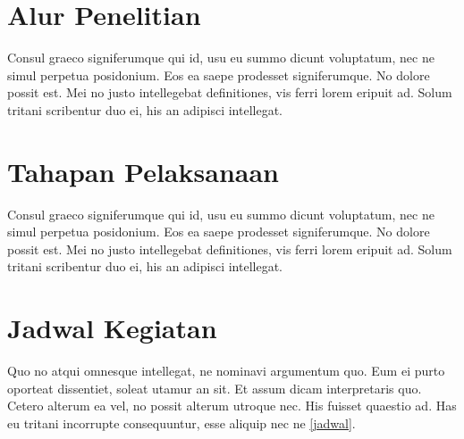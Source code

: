 \section{Alur Penelitian}
	Consul graeco signiferumque qui id, usu eu summo dicunt voluptatum, nec ne simul perpetua posidonium. Eos ea saepe prodesset signiferumque. No dolore possit est. Mei no justo intellegebat definitiones, vis ferri lorem eripuit ad. Solum tritani scribentur duo ei, his an adipisci intellegat.

\section{Tahapan Pelaksanaan}
	Consul graeco signiferumque qui id, usu eu summo dicunt voluptatum, nec ne simul perpetua posidonium. Eos ea saepe prodesset signiferumque. No dolore possit est. Mei no justo intellegebat definitiones, vis ferri lorem eripuit ad. Solum tritani scribentur duo ei, his an adipisci intellegat.

\section{Jadwal Kegiatan}
	Quo no atqui omnesque intellegat, ne nominavi argumentum quo. Eum ei purto oporteat dissentiet, soleat utamur an sit. Et assum dicam interpretaris quo. Cetero alterum ea vel, no possit alterum utroque nec. His fuisset quaestio ad. Has eu tritani incorrupte consequuntur, esse aliquip nec ne \ref{jadwal}.


